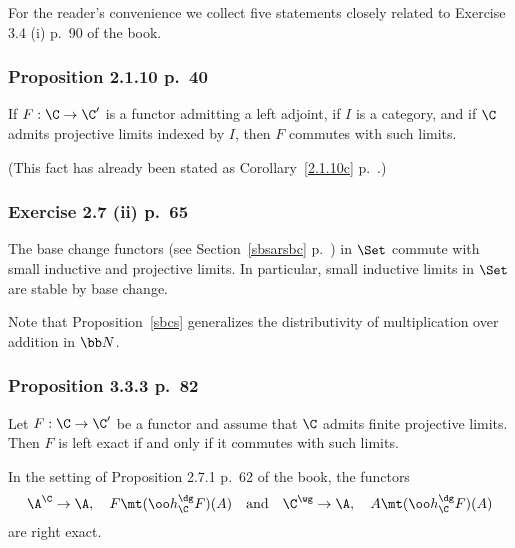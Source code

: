 \documentclass[12pt]{article}
\theoremstyle{remark}
\theoremstyle{definition}
\begin{document}


For the reader's convenience we collect five statements closely related to Exercise 3.4 (i) p.~90 of the book. 

\subsubsection{Proposition 2.1.10 p.~40}

\begin{prop}[Proposition 2.1.10 p.~40]
If $F:\C\to\C'$ is a functor admitting a left adjoint, if $I$ is a category, and if $\C$ admits projective limits indexed by $I$, then $F$ commutes with such limits.
\end{prop}

(This fact has already been stated as Corollary~\ref{2.1.10c} p.~.)

\subsubsection{Exercise 2.7 (ii) p.~65}

\begin{prop}[Exercise 2.7 (ii) p.~65]
The base change functors (see Section~\ref{sbsarsbc} p.~) in $\Set$ commute with small inductive and projective limits. In particular, small inductive limits in $\Set$ are stable by base change.
\end{prop}

Note that Proposition~\ref{sbcs} generalizes the distributivity of multiplication over addition in $\bb N$. 

\subsubsection{Proposition 3.3.3 p.~82}

\begin{prop}[Proposition 3.3.3 p.~82]
Let $F:\C\to\C'$ be a functor and assume that $\C$ admits finite projective limits. Then $F$ is left exact if and only if it commutes with such limits.
\end{prop}

\begin{cor}
In the setting of Proposition 2.7.1 p.~62 of the book, the functors
$$
\A^\C\to\A,\quad F\mt(\oo h_\C^\dg F)(A)\quad\text{and}\quad\C^\wg\to\A,\quad A\mt(\oo h_\C^\dg F)(A)
$$ 
are right exact. 
\end{cor}
\end{document}

